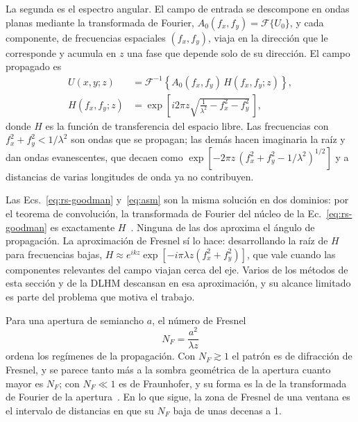 La segunda es el espectro angular. El campo de entrada se descompone en ondas
planas mediante la transformada de Fourier,
$A_0(f_x, f_y) = \mathcal{F}\{U_0\}$, y cada componente, de frecuencias
espaciales $(f_x, f_y)$, viaja en la dirección que le corresponde y acumula
en $z$ una fase que depende solo de su dirección. El campo propagado es
\begin{equation}
  \begin{split}
  U(x, y; z) &= \mathcal{F}^{-1}\!\left\{ A_0(f_x, f_y)\, H(f_x, f_y; z) \right\},\\
  H(f_x, f_y; z) &= \exp\!\left[ i 2\pi z \sqrt{\frac{1}{\lambda^2} - f_x^2 - f_y^2}\, \right],
  \end{split}
  \label{eq:asm}
\end{equation}
donde $H$ es la función de transferencia del espacio libre. Las frecuencias con
$f_x^2 + f_y^2 < 1/\lambda^2$ son ondas que se propagan; las demás hacen
imaginaria la raíz y dan ondas evanescentes, que decaen como
$\exp[-2\pi z\,(f_x^2 + f_y^2 - 1/\lambda^2)^{1/2}]$ y a distancias de varias
longitudes de onda ya no contribuyen.

Las Ecs.~\eqref{eq:rs-goodman} y~\eqref{eq:asm} son la misma solución en dos
dominios: por el teorema de convolución, la transformada de Fourier del núcleo
de la Ec.~\eqref{eq:rs-goodman} es exactamente $H$~\cite{goodman2005,
ersoy2006}. Ninguna de las dos aproxima el ángulo de propagación. La
aproximación de Fresnel sí lo hace: desarrollando la raíz de $H$ para
frecuencias bajas, $H \approx e^{ikz}\exp[-i\pi\lambda z(f_x^2 + f_y^2)]$, que
vale cuando las componentes relevantes del campo viajan cerca del eje. Varios
de los métodos de esta sección y de la DLHM descansan en esa aproximación, y su
alcance limitado es parte del problema que motiva el trabajo.

Para una apertura de semiancho $a$, el número de Fresnel
\begin{equation}
  N_F = \frac{a^2}{\lambda z}
  \label{eq:nf}
\end{equation}
ordena los regímenes de la propagación. Con $N_F \gtrsim 1$ el patrón es de
difracción de Fresnel, y se parece tanto más a la sombra geométrica de la
apertura cuanto mayor es $N_F$; con $N_F \ll 1$ es de Fraunhofer, y su forma
es la de la transformada de Fourier de la apertura~\cite{goodman2005}. En lo
que sigue, la zona de Fresnel de una ventana es el intervalo de distancias en
que su $N_F$ baja de unas decenas a 1.

